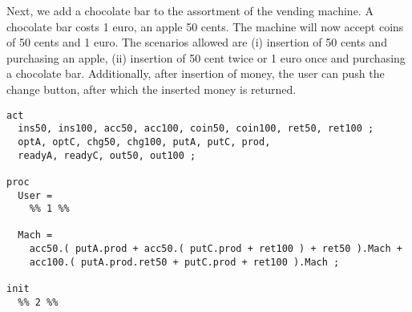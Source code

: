 \documentclass[11pt]{article}
\begin{document}
\begin{exercise} \label{ex:vm2}
Next, we add a chocolate bar to the assortment of the vending machine. A chocolate bar costs 1 euro, an apple 50 cents. The machine will now accept coins of 50 cents and 1 euro. The scenarios allowed are (i) insertion of 50 cents and purchasing an apple, (ii) insertion of 50 cent twice or 1 euro once and purchasing a chocolate bar. Additionally, after insertion of money, the user can push the change button, after which the inserted money is returned.


\begin{lstlisting}
act
  ins50, ins100, acc50, acc100, coin50, coin100, ret50, ret100 ;
  optA, optC, chg50, chg100, putA, putC, prod, 
  readyA, readyC, out50, out100 ;

proc
  User = 
    %% 1 %%

  Mach = 
    acc50.( putA.prod + acc50.( putC.prod + ret100 ) + ret50 ).Mach +
    acc100.( putA.prod.ret50 + putC.prod + ret100 ).Mach ;

init
  %% 2 %%
\end{lstlisting}


\end{exercise}
\end{document}
